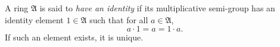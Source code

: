 A ring $\mathfrak{A}$ is said to \emph{have an identity} if its multiplicative semi-group has an identity element $1 \in \mathfrak{A}$ such that for all $a \in \mathfrak{A}$,
$$a \cdot 1 = a = 1 \cdot a.$$
If such an element exists, it is unique.

